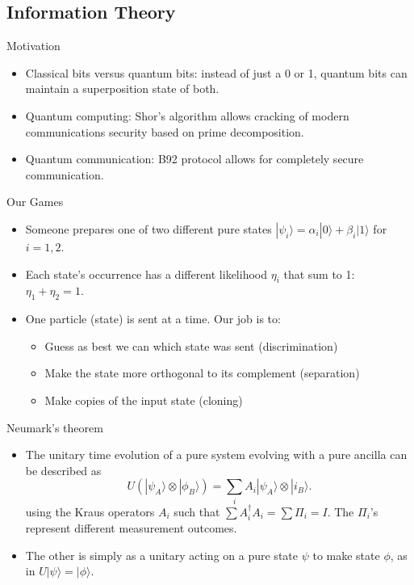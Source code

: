 \documentclass{beamer}
\newcommand{\ke}[1]{|#1\rangle}
\begin{document}
\subsection{Information Theory}
\begin{frame}{Motivation}
\begin{itemize}
\item
Classical bits versus quantum bits: instead of just a 0 or 1, quantum bits can maintain a superposition state of both.

\item
Quantum computing: Shor's algorithm allows cracking of modern communications security based on prime decomposition.

\item
Quantum communication: B92 protocol allows for completely secure communication.
\end{itemize}
\end{frame}
\begin{frame}{Our Games}
\begin{itemize}
\item
Someone prepares one of two different pure states $\ke {\psi_i} = \alpha_i \ke 0 +  \beta_i \ke 1$
for $i = 1,2$.

\item
Each state's occurrence has a different likelihood $\eta_i$ that sum to 1: $\eta_1+\eta_2 =1$.

\item
One particle (state) is sent at a time.  Our job is to:
\begin{itemize}
\item
 Guess as best we can which state was sent (discrimination)
\item Make the state more orthogonal to its complement (separation)
\item
Make copies of the input state (cloning)

\end{itemize}

\end{itemize}

\end{frame}

\begin{frame}{Neumark's theorem}
\begin{itemize}
\item
The unitary time evolution of a pure system evolving with a pure ancilla can be described as
\[U(\ke {\psi_A} \otimes \ke {\phi_B}) = \sum_i A_i \ke {\psi_A} \otimes \ke {i_B}.\]
using the  Kraus operators $A_i$ such that $\sum A^\dagger_i A_i = \sum \Pi_i = I$.
The $\Pi_i$'s represent different measurement outcomes.

\item
The other is simply as a unitary acting on a pure state $\psi$ to make state $\phi$, as in $U\ke \psi = \ke \phi$.
\end{itemize}
\end{frame}
\end{document}
